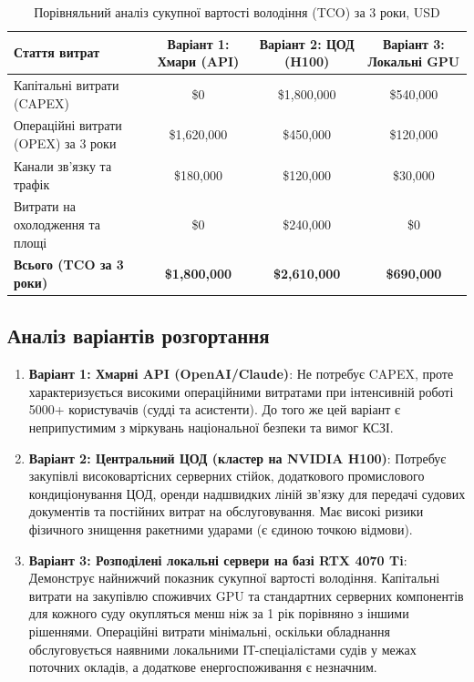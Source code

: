 \documentclass{article}
\begin{document}
\begin{table}[h]
\centering
\caption{Порівняльний аналіз сукупної вартості володіння (TCO) за 3 роки, USD} \label{tab:tco_comparison}
\vspace{10pt}
\hspace*{-2cm}\begin{tabular}{lccc}
\toprule
\textbf{Стаття витрат} & \textbf{Варіант 1: Хмари (API)} & \textbf{Варіант 2: ЦОД (H100)} & \textbf{Варіант 3: Локальні GPU} \\
\midrule
Капітальні витрати (CAPEX) & \$0 & \$1,800,000 & \$540,000 \\
Операційні витрати (OPEX) за 3 роки & \$1,620,000 & \$450,000 & \$120,000 \\
Канали зв'язку та трафік & \$180,000 & \$120,000 & \$30,000 \\
Витрати на охолодження та площі & \$0 & \$240,000 & \$0 \\
\midrule
\textbf{Всього (TCO за 3 роки)} & \textbf{\$1,800,000} & \textbf{\$2,610,000} & \textbf{\$690,000} \\
\bottomrule
\end{tabular}
\end{table}

\subsection{Аналіз варіантів розгортання}
\begin{enumerate}
\item \textbf{Варіант 1: Хмарні API (OpenAI/Claude)}: Не потребує CAPEX, проте характеризується високими операційними витратами при інтенсивній роботі 5000+ користувачів (судді та асистенти). До того же цей варіант є неприпустимим з міркувань національної безпеки та вимог КСЗІ.
\item \textbf{Варіант 2: Центральний ЦОД (кластер на NVIDIA H100)}: Потребує закупівлі високовартісних серверних стійок, додаткового промислового кондиціонування ЦОД, оренди надшвидких ліній зв'язку для передачі судових документів та постійних витрат на обслуговування. Має високі ризики фізичного знищення ракетними ударами (є єдиною точкою відмови).
\item \textbf{Варіант 3: Розподілені локальні сервери на базі RTX 4070 Ti}: Демонструє найнижчий показник сукупної вартості володіння. Капітальні витрати на закупівлю споживчих GPU та стандартних серверних компонентів для кожного суду окупляться менш ніж за 1 рік порівняно з іншими рішеннями. Операційні витрати мінімальні, оскільки обладнання обслуговується наявними локальними ІТ-спеціалістами судів у межах поточних окладів, а додаткове енергоспоживання є незначним.
\end{enumerate}
\end{document}
